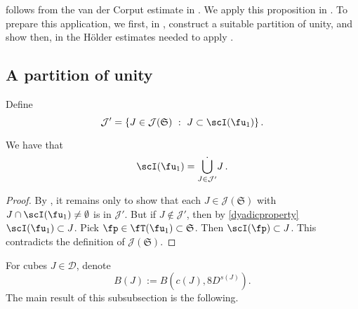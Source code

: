  follows from the van der Corput estimate in . We apply this proposition in . To prepare this application, we first, in , construct a suitable partition of unity, and show then, in  the H\"older estimates needed to apply .

\subsection{A partition of unity}
\label{subsubsec-pao}
    Define
    $$
        \mathcal{J}' = \{J \in \mathcal{J}(\mathfrak{S}) \ : \ J \subset \scI(\fu_1)\}\,.
    $$

    \begin{lemma}
        \label{dyadic-partition-1}
        \leanok
        We have that
        $$
            \scI(\fu_1) = \dot{\bigcup_{J \in \mathcal{J}'}} J\,.
        $$
    \end{lemma}

    \begin{proof}
        \leanok
        By , it remains only to show that each $J \in \mathcal{J}(\mathfrak{S})$ with $J \cap \scI(\fu_1) \ne \emptyset$ is in $\mathcal{J}'$. But if $J \notin \mathcal{J}'$, then by \eqref{dyadicproperty} $\scI(\fu_1) \subset J$. Pick $\fp \in \fT(\fu_1) \subset \mathfrak{S}$. Then $\scI(\fp) \subset J$. This contradicts the definition of $\mathcal{J}(\mathfrak{S})$.
    \end{proof}

    For cubes $J \in \mathcal{D}$, denote
    \begin{equation}
        \label{def-BJ}
        B(J) := B(c(J), 8D^{s(J)}).
    \end{equation}
    The main result of this subsubsection is the following.

